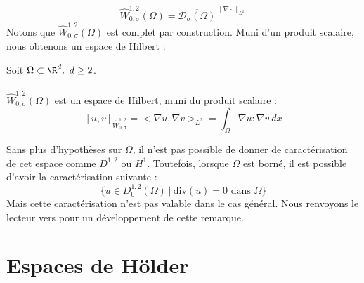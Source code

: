 $$ \widehat{W}_{0,\sigma}^{1,2}(\Omega) = \overline{\mathcal{D}_{\sigma}(\Omega)}^{\|\nabla \cdot\|_{L^2}} $$
Notons que $\widehat{W}_{0,\sigma}^{1,2}(\Omega)$ est complet par construction. Muni d'un produit scalaire, nous obtenons un espace de Hilbert :
\begin{theorembox}
    \begin{theorem}
        Soit $\Omega \subset \R^d, \ d \geq 2$. 
        \\
        \\
        $\widehat{W}_{0,\sigma}^{1,2}(\Omega)$ est un espace de Hilbert, muni du produit scalaire :
        $$[u,v]_{\widehat{W}^{1,2}_{0,\sigma}} = \big<\nabla u, \nabla v\big>_{L^2} = \int_{\Omega} \nabla u : \nabla v \ dx $$
    \end{theorem}
\end{theorembox}
Sans plus d'hypothèses sur $\Omega$, il n'est pas possible de donner de caractérisation de cet espace comme $D^{1,2}$ ou $H^1$. Toutefois, lorsque $\Omega$ est borné, il est possible d'avoir la caractérisation suivante :
$$\Big\{ u \in D^{1,2}_0(\Omega) \ | \ \text{div}(u) = 0 \text{ dans } \Omega  \Big\} $$
Mais cette caractérisation n'est pas valable dans le cas général. Nous renvoyons le lecteur vers \cite{Galdi} pour un développement de cette remarque.




\section{Espaces de Hölder}

